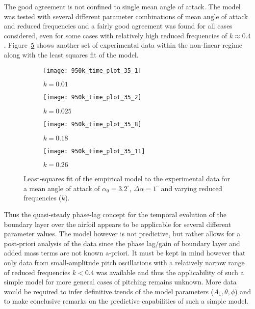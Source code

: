 The good agreement is not confined to single mean angle of attack. The model was tested with several different parameter combinations of mean angle of attack and reduced frequencies and a fairly good agreement was found for all cases considered, even for some cases with relatively high reduced frequencies of $k\approx0.4$. Figure~\ref{fig:model_fits2} shows another set of experimental data within the non-linear regime along with the least squares fit of the model.
\begin{figure}[h]
	\centering
	\begin{subfigure}[b]{0.45\textwidth}
		\centering
		\texttt{[image: 950k\_time\_plot\_35\_1]}
		\caption{$k=0.01$}
		\label{fig:k_01_2}
	\end{subfigure}
	\begin{subfigure}[b]{0.45\textwidth}
		\centering
		\texttt{[image: 950k\_time\_plot\_35\_2]}
		\caption{$k=0.025$}
		\label{fig:k_025_2}
	\end{subfigure}
	\begin{subfigure}[b]{0.45\textwidth}
		\centering
		\texttt{[image: 950k\_time\_plot\_35\_8]}
		\caption{$k=0.18$}
		\label{fig:k_18_2}
	\end{subfigure}
	\begin{subfigure}[b]{0.45\textwidth}
		\centering
		\texttt{[image: 950k\_time\_plot\_35\_11]}
		\caption{$k=0.26$}
		\label{fig:k_2_2}
	\end{subfigure}	
	\caption{Least-squares fit of the empirical model to the experimental data for a mean angle of attack of $\alpha_{0}=3.2^{\circ}$, $\Delta\alpha=1^{\circ}$ and varying reduced frequencies ($k$).}
	\label{fig:model_fits2}
\end{figure}
Thus the quasi-steady phase-lag concept for the temporal evolution of the boundary layer over the airfoil appears to be applicable for several different parameter values. The model however is not predictive, but rather allows for a post-priori analysis of the data since the phase lag/gain of boundary layer and added mass terms are not known a-priori. It must be kept in mind however that only data from small-amplitude pitch oscillations with a relatively narrow range of reduced frequencies $k<0.4$ was available and thus the applicability of such a simple model for more general cases of pitching remains unknown. More data would be required to infer definitive trends of the model parameters ($A_{1},\theta,\phi$) and to make conclusive remarks on the predictive capabilities of such a simple model.

